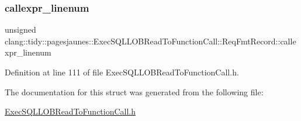 \subsubsection{\texorpdfstring{callexpr\+\_\+linenum}{callexpr\_linenum}}
{\footnotesize\ttfamily unsigned clang\+::tidy\+::pagesjaunes\+::\+Exec\+S\+Q\+L\+L\+O\+B\+Read\+To\+Function\+Call\+::\+Req\+Fmt\+Record\+::callexpr\+\_\+linenum}



Definition at line 111 of file Exec\+S\+Q\+L\+L\+O\+B\+Read\+To\+Function\+Call.\+h.



The documentation for this struct was generated from the following file\+:\begin{DoxyCompactItemize}
\item 
\hyperlink{_exec_s_q_l_l_o_b_read_to_function_call_8h}{Exec\+S\+Q\+L\+L\+O\+B\+Read\+To\+Function\+Call.\+h}\end{DoxyCompactItemize}

